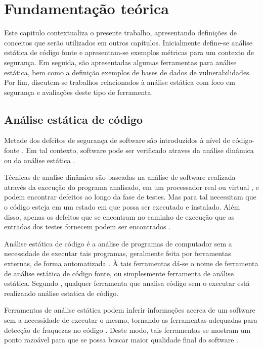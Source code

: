\chapter{Fundamentação teórica}\label{fundamentacao_teorica}

Este capitulo contextualiza o presente trabalho, apresentando definições de conceitos que serão utilizados em outros capítulos. Inicialmente define-se análise estática de código fonte e apresentam-se exemplos métricas para um contexto de segurança. Em seguida, são apresentadas algumas ferramentas para análise estática, bem como a definição exemplos de bases de dados de vulnerabilidades. Por fim, discutem-se trabalhos relacionados à análise estática com foco em segurança e avaliações deste tipo de ferramenta.

\section{Análise estática de código}\label{fundamentacao_teorica:analise_estatica_de_codigo}

Metade dos defeitos de segurança de software são introduzidos à nível de código-fonte \cite{vadim}. Em tal contexto, software pode ser verificado atraves da análise dinâmica ou da análise estática \cite{concolic}.

Técnicas de analise dinâmica são baseadas na análise de software realizada através da execução do programa analisado, em um processador real ou virtual \cite{concolic}, e podem encontrar defeitos ao longo da fase de testes. Mas para tal necessitam que o código esteja em um estado em que possa ser executado e instalado. Além disso, apenas os defeitos que se encontram no caminho de execução que as entradas dos testes fornecem podem ser encontrados \cite{harvard}.

Análise estática de código é a análise de programas de computador sem a necessidade de executar tais programas, geralmente feita por ferramentas externas, de forma automatizada \cite{kannavara}. À tais ferramentas dá-se o nome de ferramenta de análise estática de código fonte, ou simplesmente ferramenta de análise estática. Segundo \cite{secure_programming}, qualquer ferramenta que analisa código sem o executar está realizando análise estatica de código.

Ferramentas de análise estática podem inferir informações  acerca de um software sem a necessidade de executar o mesmo, tornando-as ferramentas adequadas para detecção de fraquezas no código \cite{vadim}. Deste modo, tais ferramentas se mostram um ponto razoável para que se possa buscar maior qualidade final do software \cite{sa_spec}.

